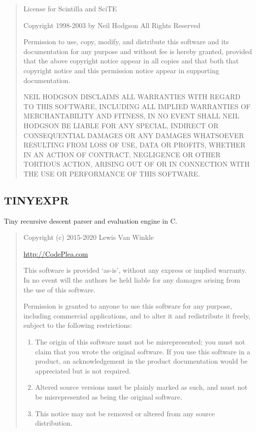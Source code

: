 \documentclass[
]{book}
\providecommand{\tightlist}{%
  \setlength{\itemsep}{0pt}\setlength{\parskip}{0pt}}
\theoremstyle{definition}
\theoremstyle{definition}
\theoremstyle{definition}
\theoremstyle{definition}
\theoremstyle{remark}
\begin{document}
\begin{quote}
License for Scintilla and SciTE

Copyright 1998-2003 by Neil Hodgson All Rights Reserved

Permission to use, copy, modify, and distribute this software and its
documentation for any purpose and without fee is hereby granted,
provided that the above copyright notice appear in all copies and that
both that copyright notice and this permission notice appear in
supporting documentation.

NEIL HODGSON DISCLAIMS ALL WARRANTIES WITH REGARD TO THIS
SOFTWARE, INCLUDING ALL IMPLIED WARRANTIES OF MERCHANTABILITY
AND FITNESS, IN NO EVENT SHALL NEIL HODGSON BE LIABLE FOR ANY
SPECIAL, INDIRECT OR CONSEQUENTIAL DAMAGES OR ANY DAMAGES
WHATSOEVER RESULTING FROM LOSS OF USE, DATA OR PROFITS,
WHETHER IN AN ACTION OF CONTRACT, NEGLIGENCE OR OTHER
TORTIOUS ACTION, ARISING OUT OF OR IN CONNECTION WITH THE USE
OR PERFORMANCE OF THIS SOFTWARE.
\end{quote}

\hypertarget{tinyexpr}{%
\subsection*{TINYEXPR}\label{tinyexpr}}

Tiny recursive descent parser and evaluation engine in C.

\begin{quote}
Copyright (c) 2015-2020 Lewis Van Winkle

\url{http://CodePlea.com}

This software is provided `as-is', without any express or implied
warranty. In no event will the authors be held liable for any damages
arising from the use of this software.

Permission is granted to anyone to use this software for any purpose,
including commercial applications, and to alter it and redistribute it
freely, subject to the following restrictions:

\begin{enumerate}
\def\labelenumi{\arabic{enumi}.}
\tightlist
\item
  The origin of this software must not be misrepresented; you must not
  claim that you wrote the original software. If you use this software
  in a product, an acknowledgement in the product documentation would be
  appreciated but is not required.
\item
  Altered source versions must be plainly marked as such, and must not be
  misrepresented as being the original software.
\item
  This notice may not be removed or altered from any source distribution.
\end{enumerate}
\end{quote}
\end{document}
